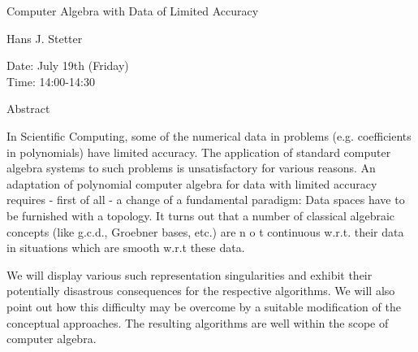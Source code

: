 \begin{center}
\LARGE
Computer Algebra with Data of Limited Accuracy 

\end{center}

\begin{center}
\Large
Hans J. Stetter
\end{center}

\noindent
Date:  July 19th (Friday)\\
Time:  14:00-14:30\\

\begin{center}
\large
Abstract
\end{center}

In Scientific Computing, some of the numerical data in problems (e.g. coefficients in polynomials)
have limited accuracy. The application of standard computer algebra systems to such problems is
unsatisfactory for various reasons. An adaptation of polynomial computer algebra for data with
limited accuracy requires - first of all - a change of a fundamental paradigm: Data spaces have to
be furnished with a topology. It turns out that a number of classical algebraic concepts (like g.c.d.,
Groebner bases, etc.) are n o t continuous w.r.t. their data in situations which are smooth w.r.t
these data. 

We will display various such representation singularities and exhibit their potentially disastrous
consequences for the respective algorithms. We will also point out how this difficulty may be
overcome by a suitable modification of the conceptual approaches. The resulting algorithms are
well within the scope of computer algebra. 

